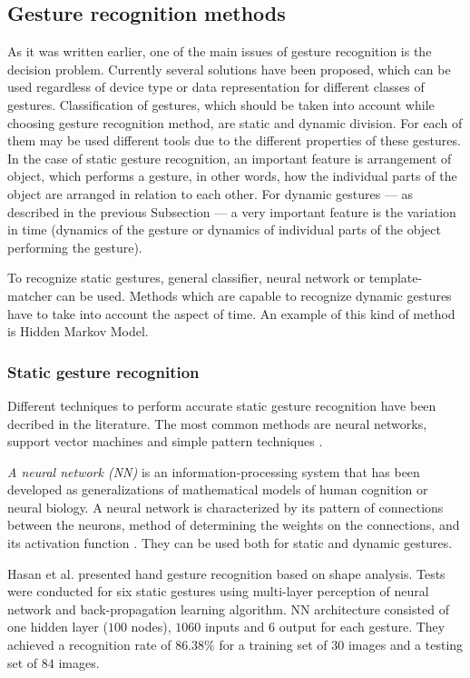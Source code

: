 \subsection{Gesture recognition methods}\label{DynamicStaticText}
As it was written earlier, one of the main issues of gesture recognition is the decision problem. Currently several solutions have been proposed, which can be used regardless of device type or data representation for different classes of gestures. Classification of gestures, which should be taken into account while choosing gesture recognition method, are static and dynamic division. For each of them may be used different tools due to the different properties of these gestures. In the case of static gesture recognition, an important feature is arrangement of object, which performs a gesture, in other words, how the individual parts of the object are arranged in relation to each other. For dynamic gestures --- as described in the previous Subsection --- a very important feature is the variation in time (dynamics of the gesture or dynamics of individual parts of the object performing the gesture).

To recognize static gestures, general classifier, neural network or template-matcher can be used. Methods which are capable to recognize dynamic gestures have to take into account the aspect of time. An example of this kind of method is Hidden Markov Model.

\subsubsection{Static gesture recognition}

Different techniques to perform accurate static gesture recognition have been decribed in the literature. The most common methods are neural networks, support vector machines and simple pattern techniques \cite{journals/jbcs/SavarisW10}.

\emph{A neural network (NN)} is an information-processing system that has been developed as generalizations of mathematical models of human cognition or neural biology. A neural network is characterized by its pattern of connections between the neurons, method of determining the weights on the connections, and its activation function \cite{Fausett:1994:FNN:197023}. They can be used both for static and dynamic gestures.

Hasan et al. \cite{HasanStaticHand} presented hand gesture recognition based on shape analysis. Tests were conducted for six static gestures using multi-layer perception of neural network and back-propagation learning algorithm. NN architecture consisted of one hidden layer ($100$ nodes), $1060$ inputs and $6$ output for each gesture. They achieved a recognition rate of $86.38\%$ for a training set of $30$ images and a testing set of $84$ images.


